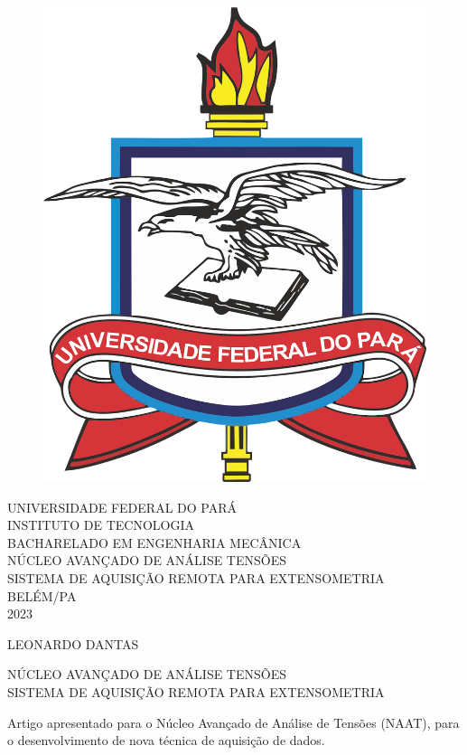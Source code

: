 \thispagestyle{empty}

\begin{center}
	\begin{figure}[h]
		\centering
		\includegraphics[width=0.20\linewidth]{pics/ufpa}
		\label{fig:ufpa}
	\end{figure}


	\vspace{1cm}
	\large \uppercase{UNIVERSIDADE FEDERAL DO PARÁ}\\
	\large \uppercase{INSTITUTO DE TECNOLOGIA}\\
	\large \uppercase{BACHARELADO EM ENGENHARIA MECÂNICA}\\
	\vspace{5cm}
	\large \uppercase{NÚCLEO AVANÇADO DE ANÁLISE TENSÕES}\\
	\vspace{1cm}
	\large \uppercase {SISTEMA DE AQUISIÇÃO REMOTA PARA EXTENSOMETRIA} \\
	\vspace{6cm}
	\large {BELÉM/PA \\ 2023}


\end{center}
	\newpage
	\setcounter{page}{1} %
	\thispagestyle{empty}

\begin{center}
	LEONARDO DANTAS \\

	\vspace{5cm}

	NÚCLEO AVANÇADO DE ANÁLISE TENSÕES\\
	SISTEMA DE AQUISIÇÃO REMOTA PARA EXTENSOMETRIA\\
\end{center}
	\vspace{5cm}




\singlespacing
\hspace{8cm} %
\begin{minipage}{7cm}
	\indent Artigo apresentado para o Núcleo Avançado de Análise de Tensões (NAAT), para o desenvolvimento de nova técnica de aquisição de dados.
\end{minipage}
\vspace{7cm}

